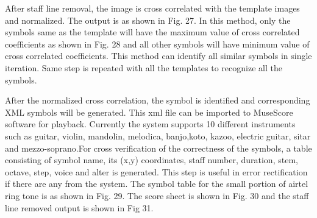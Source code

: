 \documentclass[journal]{IEEEtran}
\begin{document}
After staff line removal, the image is cross correlated with the template images and normalized. The output is as shown in Fig. 27. In this method, only the symbols same as the template will have the maximum value of cross correlated coefficients as shown in Fig. 28 and all other symbols will have minimum value of cross correlated coefficients. This method can identify all similar symbols in single iteration. Same step is repeated with all the templates to recognize all the symbols. \par
After the normalized cross correlation, the symbol is identified and corresponding XML symbols will be generated. This xml file can be imported to MuseScore software for playback. Currently the system supports 10 different instruments such as guitar, violin, mandolin, melodica, banjo,koto, kazoo, electric guitar, sitar and mezzo-soprano.For cross verification of the correctness of the symbols, a table consisting of symbol name, its (x,y) coordinates, staff number, duration, stem, octave, step, voice and alter is generated. This step is useful in error rectification if there are any from the system. The symbol table for the small portion of airtel ring tone is as shown in Fig. 29. The score sheet is shown in Fig. 30 and the staff line removed output is shown in Fig 31.




%
\end{document}
